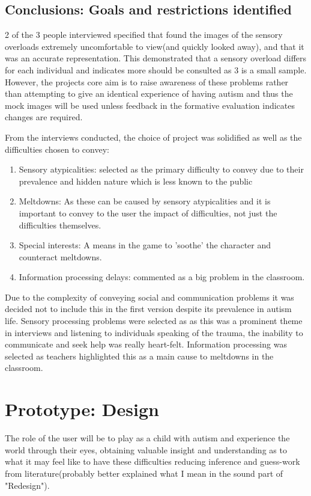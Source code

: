 \documentclass[11pt]{report}
\begin{document}
\section{Conclusions: Goals and restrictions identified}

2 of the 3 people interviewed specified that found the images of the sensory overloads extremely uncomfortable to view(and quickly looked away), and that it was an accurate representation. This demonstrated that a sensory overload differs for each individual and indicates more should be consulted as 3 is a small sample. However, the projects core aim is to raise awareness of these problems rather than attempting to give an identical experience of having autism and thus the mock images will be used unless feedback in the formative evaluation indicates changes are required. 

From the interviews conducted, the choice of project was solidified as well as the difficulties chosen to convey:

\begin{enumerate}
\item Sensory atypicalities: selected as the primary difficulty to convey due to their prevalence and hidden nature which is less known to the public
\item Meltdowns: As these can be caused by sensory atypicalities and it is important to convey to the user the impact of difficulties, not just the difficulties themselves.
\item Special interests: A means in the game to 'soothe' the character and counteract meltdowns.
\item Information processing delays: commented as a big problem in the classroom.
\end{enumerate}

Due to the complexity of conveying social and communication problems it was decided not to include this in the first version despite its prevalence in autism life. Sensory processing problems were selected as as this was a prominent theme in interviews and listening to individuals speaking of the trauma, the inability to communicate and seek help was really heart-felt. Information processing was selected as teachers highlighted this as a main cause to meltdowns in the classroom. 


\chapter{Prototype: Design}
The role of the user will be to play as a child with autism and experience the world through their eyes, obtaining valuable insight and understanding as to what it may feel like to have these difficulties reducing inference and guess-work from literature(probably better explained what I mean in the sound part of "Redesign").
\end{document}
